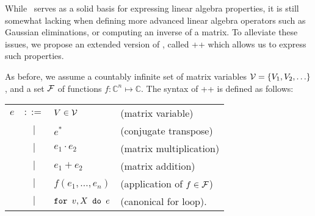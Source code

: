 


While \lang\ serves as a solid basis for expressing linear algebra properties, it is still somewhat lacking when defining more advanced linear algebra operators such as Gaussian eliminations, or computing an inverse of a matrix. To alleviate these issues, we propose an extended version of \lang, called \lang++ which allows us to express such properties.

As before, we assume a countably infinite set of matrix variables $\mathcal{V} = \{V_1, V_2, \ldots\}$, and a set $\mathcal{F}$  of functions $f:\mathbb{C}^n \mapsto \mathbb{C}$. The syntax of \lang++ is defined as follows:


\medskip

\begin{tabular}{lcll}
$e$ & $::=$ & $V\in \mathcal{V}$ & (matrix variable)\\
 & $|$ & $e^*$ & (conjugate transpose)\\ 
 & $|$ & $e_1 \cdot e_2$ & (matrix multiplication)\\   
 & $|$ & $e_1 + e_2$ & (matrix addition)\\    
 & $|$ & $f(e_1,\ldots ,e_n)$ & (application of $f\in \mathcal{F}$)\\
 & $|$ & $\texttt{for }v,X \texttt{ do }e$ & (canonical for loop). 
\end{tabular}

\medskip


